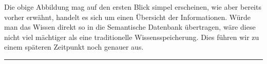 Die obige Abbildung mag auf den ersten Blick simpel erscheinen, wie aber bereits vorher erwähnt, handelt es sich um einen Übersicht der Informationen. Würde man das Wissen direkt so in die Semantische Datenbank übertragen, wäre diese nicht viel mächtiger als eine traditionelle Wissensspeicherung. Dies führen wir zu einem späteren Zeitpunkt noch genauer aus.

\noindent\rule[1ex]{\textwidth}{1pt}


